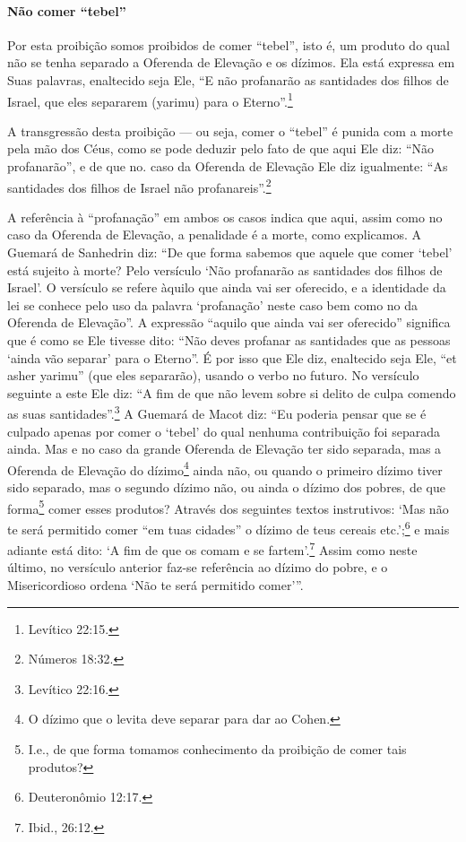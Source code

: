 \paragraph{Não comer ``tebel''}

Por esta proibição somos proibidos de comer ``tebel'', isto é, um
produto do qual não se tenha separado a Oferenda de Elevação e os
dízimos. Ela está expressa em Suas palavras, enaltecido seja Ele, ``E
não profanarão as santidades dos filhos de Israel, que eles separarem
(yarimu) para o Eterno''.\footnote{Levítico 22:15.}

A transgressão desta proibição --- ou seja, comer o ``tebel'' é punida
com a morte pela mão dos Céus, como se pode deduzir pelo fato de que
aqui Ele diz: ``Não profanarão'', e de que no. caso da Oferenda de
Elevação Ele diz igualmente: ``As santidades dos filhos de Israel não
profanareis''.\footnote{Números 18:32.}

A referência à ``profanação'' em ambos os casos indica que aqui, assim
como no caso da Oferenda de Elevação, a penalidade é a morte, como
explicamos.
A Guemará de Sanhedrin diz: ``De que forma sabemos que aquele
que comer `tebel' está sujeito à morte? Pelo versículo `Não profanarão
as santidades dos filhos de Israel'. O versículo se refere àquilo que
ainda vai ser oferecido, e a identidade da lei se conhece pelo uso da
palavra `profanação' neste caso bem como no da Oferenda de Elevação''. A
expressão ``aquilo que ainda vai ser oferecido'' significa que é como se
Ele tivesse dito: ``Não deves profanar as santidades que as pessoas
`ainda vão separar' para o Eterno''. É por isso que Ele diz, enaltecido
seja Ele, ``et asher yarimu'' (que eles separarão), usando o verbo no
futuro. No versículo seguinte a este Ele diz: ``A fim de que não levem
sobre si delito de culpa comendo as suas santidades''.\footnote{Levítico 22:16.}
A Guemará de Macot diz: ``Eu poderia pensar que se é culpado apenas por
comer o `tebel' do qual nenhuma contribuição foi separada ainda. Mas
e no caso da grande Oferenda de Elevação ter sido separada, mas a
Oferenda de Elevação do dízimo\footnote{O dízimo que o levita deve separar para dar ao Cohen.} ainda não, ou quando o
primeiro dízimo tiver sido separado, mas o segundo dízimo não, ou ainda
o dízimo dos pobres, de que forma\footnote{I.e., de que forma tomamos conhecimento da proibição de comer tais
  produtos?} comer esses
produtos? Através dos seguintes textos instrutivos: `Mas não te será
permitido comer ``em tuas cidades'' o dízimo de teus cereais etc.';\footnote{Deuteronômio 12:17.} e mais adiante está dito: `A fim de que os comam e
se fartem'.\footnote{Ibid., 26:12.} Assim como neste último, no versículo
anterior faz-se referência ao dízimo do pobre, e o Misericordioso ordena
`Não te será permitido comer'''.

